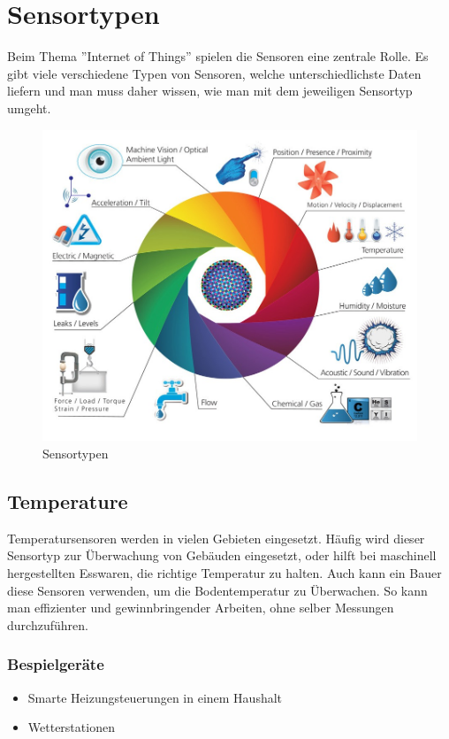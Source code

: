 \section{Sensortypen}
Beim Thema ''Internet of Things'' spielen die Sensoren eine zentrale Rolle. Es gibt viele verschiedene Typen von Sensoren, welche unterschiedlichste Daten liefern und man muss daher wissen, wie man mit dem jeweiligen Sensortyp umgeht. 
\begin{figure}[H]
\centering
\includegraphics[scale=0.35]{images/sensors.jpg}
\caption{Sensortypen\cite{SensorImage}}
\end{figure}

\subsection{Temperature}%
Temperatursensoren werden in vielen Gebieten eingesetzt. Häufig wird dieser Sensortyp zur Überwachung von Gebäuden eingesetzt, oder hilft bei maschinell hergestellten Esswaren, die richtige Temperatur zu halten. Auch kann ein Bauer diese Sensoren verwenden, um die Bodentemperatur zu Überwachen. So kann man effizienter und gewinnbringender Arbeiten, ohne selber Messungen durchzuführen.
\subsubsection{Bespielgeräte}
\begin{itemize}
\item	Smarte Heizungsteuerungen in einem Haushalt
\item	Wetterstationen
\end{itemize}


